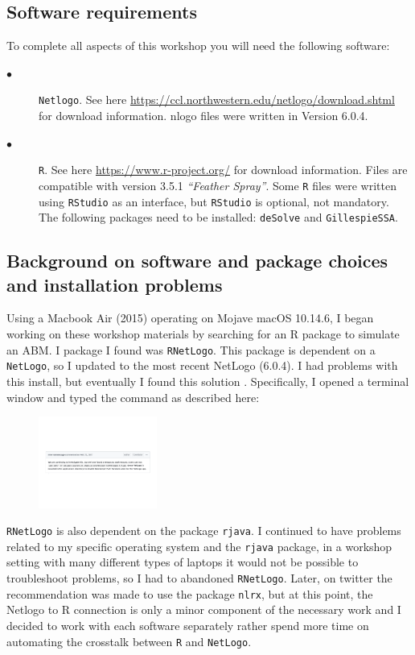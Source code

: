 \documentclass[11pt, oneside]{article}   	%
\begin{document}
\subsection{Software requirements}
\label{sec:software}
To complete all aspects of this workshop you will need the following software:
\begin{description}
\item[$\bullet$] \texttt{Netlogo}. See here \url{https://ccl.northwestern.edu/netlogo/download.shtml} for download information. nlogo files were written in Version 6.0.4.
\item[$\bullet$] \texttt{R}. See here \url{https://www.r-project.org/} for download information. Files are compatible with version 3.5.1 \emph{``Feather Spray''}. Some \texttt{R} files were written using \texttt{RStudio} as an interface, but \texttt{RStudio} is optional, not mandatory. The following packages need to be installed: \texttt{deSolve} and \texttt{GillespieSSA}.
\end{description}


\subsection{Background on software and package choices and installation problems}

Using a Macbook Air (2015) operating on Mojave macOS 10.14.6, I began working on these workshop materials by searching for an R package to simulate an ABM. I package I found was \texttt{RNetLogo}. This package is dependent on a \texttt{NetLogo}, so I updated to the most recent NetLogo (6.0.4). I had problems with this install, but eventually I found this solution \cite{soln}. Specifically, I opened a terminal window and typed the command as described here:

\begin{figure}[!ht]
\includegraphics[height=3cm]{workaround}
\end{figure}

\texttt{RNetLogo} is also dependent on the package \texttt{rjava}. I continued to have problems related to my specific operating system and the \texttt{rjava} package, in a workshop setting with many different types of laptops it would not be possible to troubleshoot problems, so I had to abandoned \texttt{RNetLogo}. Later, on twitter the recommendation was made to use the package \texttt{nlrx}, but at this point, the Netlogo to R connection is only a minor component of the necessary work and I decided to work with each software separately rather spend more time on automating the crosstalk between \texttt{R} and \texttt{NetLogo}.
\end{document}
